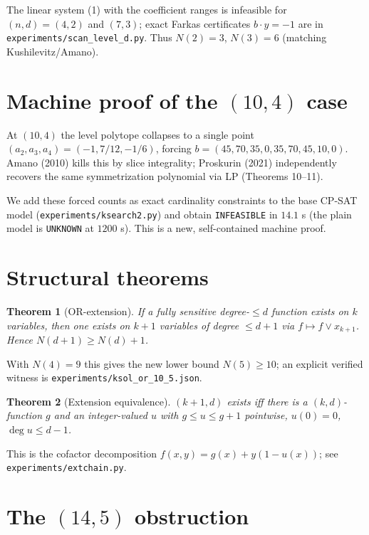 \documentclass[11pt,a4paper]{article}
\newtheorem{theorem}{Theorem}
\theoremstyle{definition}
\theoremstyle{remark}
\begin{document}
The linear system (1) with the coefficient ranges is infeasible for
$(n,d)=(4,2)$ and $(7,3)$; exact Farkas certificates $b\cdot y=-1$ are in
\texttt{experiments/scan\_level\_d.py}.  Thus $N(2)=3$, $N(3)=6$ (matching
Kushilevitz/Amano).

\section{Machine proof of the $(10,4)$ case}
\label{sec:tenfour}

At $(10,4)$ the level polytope collapses to a single point
\((a_2,a_3,a_4)=(-1,7/12,-1/6)\), forcing
\(b=(45,70,35,0,35,70,45,10,0)\).  Amano (2010) kills this by slice
integrality; Proskurin (2021) independently recovers the same symmetrization
polynomial via LP (Theorems 10--11).

We add these forced counts as exact cardinality constraints to the base CP-SAT
model (\texttt{experiments/ksearch2.py}) and obtain \texttt{INFEASIBLE} in
$14.1$ s (the plain model is \texttt{UNKNOWN} at $1200$ s).  This is a new,
self-contained machine proof.

\section{Structural theorems}
\label{sec:struct}

\begin{theorem}[OR-extension]
If a fully sensitive degree-$\le d$ function exists on $k$ variables, then one
exists on $k+1$ variables of degree $\le d+1$ via $f\mapsto f\vee x_{k+1}$.
Hence $N(d+1)\ge N(d)+1$.
\end{theorem}

With $N(4)=9$ this gives the new lower bound $N(5)\ge 10$; an explicit
verified witness is \texttt{experiments/ksol\_or\_10\_5.json}.

\begin{theorem}[Extension equivalence]
$(k+1,d)$ exists iff there is a $(k,d)$-function $g$ and an integer-valued
$u$ with $g\le u\le g+1$ pointwise, $u(0)=0$, $\deg u\le d-1$.
\end{theorem}
This is the cofactor decomposition $f(x,y)=g(x)+y(1-u(x))$; see
\texttt{experiments/extchain.py}.

\section{The $(14,5)$ obstruction}
\label{sec:fourteenfive}
\end{document}
